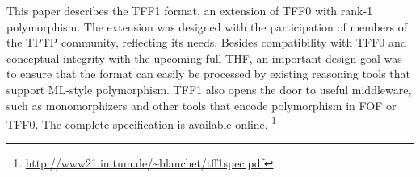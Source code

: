 This paper describes the TFF1
format, an extension of TFF0 with rank-1 polymorphism.
The extension was designed with the participation of members of the TPTP
community, reflecting its needs.
Besides compatibility with TFF0 and conceptual integrity with the upcoming full
THF, an important design goal was to ensure that the format can easily be
processed by existing reasoning tools that support ML-style polymorphism. TFF1
also opens the door to useful middleware, such as monomorphizers and other
tools that encode polymorphism in FOF or TFF0.
The complete specification is available online.%
\footnote{\url{http://www21.in.tum.de/~blanchet/tff1spec.pdf}}

